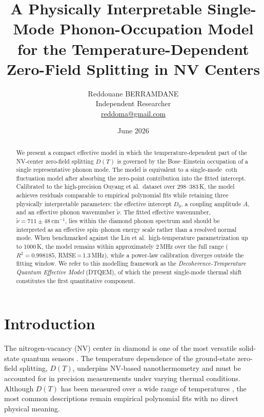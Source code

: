 \documentclass[12pt,a4paper]{article}
\title{\textbf{A Physically Interpretable Single-Mode Phonon-Occupation Model
for the Temperature-Dependent Zero-Field Splitting in NV Centers}}
\author{Reddouane BERRAMDANE\\
\small Independent Researcher\\
\small \href{mailto:reddoma@gmail.com}{reddoma@gmail.com}}
\date{June 2026}
\begin{document}
\maketitle

\begin{abstract}
We present a compact effective model in which the temperature-dependent
part of the NV-center zero-field splitting $D(T)$ is governed by the
Bose--Einstein occupation of a single representative phonon mode.
The model is equivalent to a single-mode $\coth$ fluctuation model
after absorbing the zero-point contribution into the fitted intercept.
Calibrated to the high-precision Ouyang et al.\ dataset over 298--383\,K,
the model achieves residuals comparable to empirical polynomial fits while
retaining three physically interpretable parameters: the effective intercept
$D_0$, a coupling amplitude $A$, and an effective phonon wavenumber
$\tilde{\nu}$.
The fitted effective wavenumber,
$\tilde{\nu} = 711 \pm 48\ \mathrm{cm}^{-1}$,
lies within the diamond phonon spectrum and should be interpreted as an
effective spin--phonon energy scale rather than a resolved normal mode.
When benchmarked against the Liu et al.\ high-temperature parametrization
up to 1000\,K, the model remains within approximately 2\,MHz over the full
range ($R^2 = 0.998185$, RMSE\,=\,1.3\,MHz), while a power-law calibration
diverges outside the fitting window.
We refer to this modelling framework as the
\emph{Decoherence-Temperature Quantum Effective Model} (DTQEM),
of which the present single-mode thermal shift constitutes the
first quantitative component.
\end{abstract}

\section{Introduction}

The nitrogen-vacancy (NV) center in diamond is one of the most versatile
solid-state quantum sensors \cite{Degen2017,Barry2020}.
The temperature dependence of the ground-state zero-field splitting,
$D(T)$, underpins NV-based nanothermometry \cite{Kucsko2013,Neumann2013,Toyli2013a}
and must be accounted for in precision measurements under varying thermal
conditions.
Although $D(T)$ has been measured over a wide range of temperatures
\cite{Acosta2010,Chen2011,Toyli2012,Plakhotnik2014,Ouyang2024},
the most common descriptions remain empirical polynomial fits with no
direct physical meaning.
\end{document}
